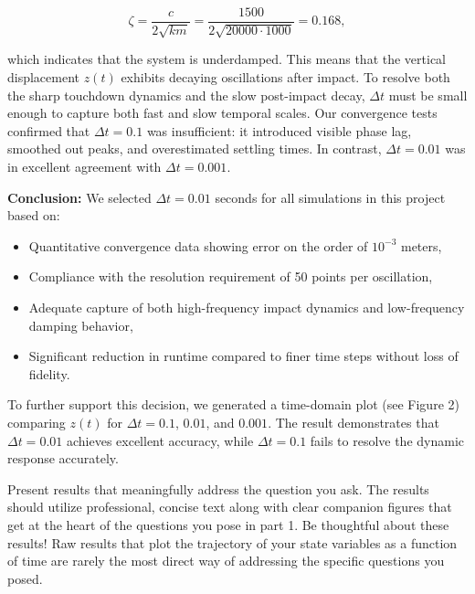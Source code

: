 \documentclass[12pt,letterpaper, onecolumn]{exam}
\begin{document}
\begin{questions}
\begin{solution}
\begin{parts}
        $$
        \zeta = \frac{c}{2\sqrt{km}} = \frac{1500}{2\sqrt{20000 \cdot 1000}} = 0.168,
        $$
        
        which indicates that the system is underdamped. This means that the vertical displacement $z(t)$ exhibits decaying oscillations after impact. To resolve both the sharp touchdown dynamics and the slow post-impact decay, $\Delta t$ must be small enough to capture both fast and slow temporal scales. Our convergence tests confirmed that $\Delta t = 0.1$ was insufficient: it introduced visible phase lag, smoothed out peaks, and overestimated settling times. In contrast, $\Delta t = 0.01$ was in excellent agreement with $\Delta t = 0.001$.
        
        \textbf{Conclusion:} We selected $\Delta t = 0.01$ seconds for all simulations in this project based on:
        \begin{itemize}
            \item Quantitative convergence data showing error on the order of $10^{-3}$ meters,
            \item Compliance with the resolution requirement of 50 points per oscillation,
            \item Adequate capture of both high-frequency impact dynamics and low-frequency damping behavior,
            \item Significant reduction in runtime compared to finer time steps without loss of fidelity.
        \end{itemize}
        
        To further support this decision, we generated a time-domain plot (see Figure 2) comparing $z(t)$ for $\Delta t = 0.1$, $0.01$, and $0.001$. The result demonstrates that $\Delta t = 0.01$ achieves excellent accuracy, while $\Delta t = 0.1$ fails to resolve the dynamic response accurately.
        
        

    \end{parts}

\end{solution}



\question[22 Points] Present results that meaningfully address the question you ask. The results should utilize professional, concise text along with clear companion figures that get at the heart of the questions you pose in part 1. Be thoughtful about these results! Raw results that plot the trajectory of your state variables as a function of time are rarely the most direct way of addressing the specific questions
you posed. \droppoints


\end{questions}
\end{document}

